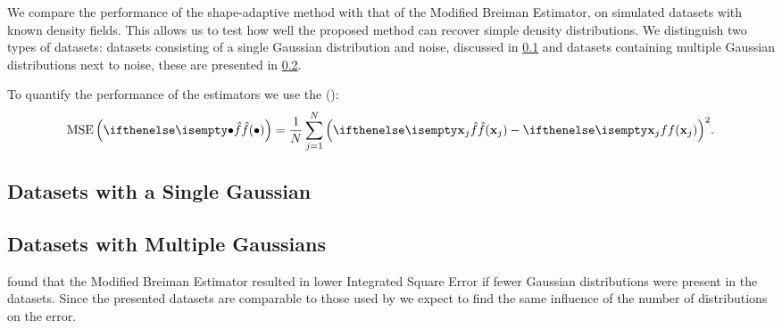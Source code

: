 We compare the performance of the shape-adaptive method with that of the Modified Breiman Estimator, on simulated datasets with known density fields. This allows us to test how well the proposed method can recover simple density distributions. We distinguish two types of datasets: datasets consisting of a single Gaussian distribution and noise, discussed in \cref{s:experiment:singlesphere} and datasets containing multiple Gaussian distributions next to noise, these are presented in \cref{s:experiment:multisphere}.

To quantify the performance of the estimators we use the \mse (\MSE):
\begin{equation*}
	\varMSE{\varEstimatedDensityFunction{\bullet}} = \frac{1}{\varNumPatterns} \sum_{\itXs = 1}^{\varNumPatterns} {\left(\varEstimatedDensityFunction{\varPattern[\itXs]} - \varDensityFunction{\varPattern[\itXs]} \right)}^2.
\end{equation*}

\subsection{Datasets with a Single Gaussian}
\label{s:experiment:singlesphere}


\subsection{Datasets with Multiple Gaussians}
\label{s:experiment:multisphere}


\textcite{ferdosi2011comparison} found that the Modified Breiman Estimator resulted in lower Integrated Square Error if fewer Gaussian distributions were present in the datasets. Since the presented datasets are comparable to those used by \citeauthor{ferdosi2011comparison} we expect to find the same influence of the number of distributions on the error.